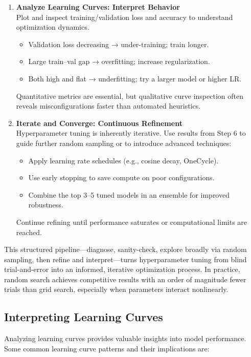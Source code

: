 \begin{enumerate}
	\item \textbf{Analyze Learning Curves: Interpret Behavior}\\
	Plot and inspect training/validation loss and accuracy to understand optimization dynamics.
	\begin{itemize}
		\item Validation loss decreasing → under-training; train longer.
		\item Large train–val gap → overfitting; increase regularization.
		\item Both high and flat → underfitting; try a larger model or higher LR.
	\end{itemize}
	Quantitative metrics are essential, but qualitative curve inspection often reveals misconfigurations faster than automated heuristics.
	
	\item \textbf{Iterate and Converge: Continuous Refinement}\\
	Hyperparameter tuning is inherently iterative.  
	Use results from Step 6 to guide further random sampling or to introduce advanced techniques:
	\begin{itemize}
		\item Apply learning rate schedules (e.g., cosine decay, OneCycle).
		\item Use early stopping to save compute on poor configurations.
		\item Combine the top 3–5 tuned models in an ensemble for improved robustness.
	\end{itemize}
	Continue refining until performance saturates or computational limits are reached.
\end{enumerate}

\noindent This structured pipeline—diagnose, sanity-check, explore broadly via random sampling, then refine and interpret—turns hyperparameter tuning from blind trial-and-error into an informed, iterative optimization process.  
In practice, random search achieves competitive results with an order of magnitude fewer trials than grid search, especially when parameters interact nonlinearly.

\subsection{Interpreting Learning Curves}
\label{subsec:learning_curves}

Analyzing learning curves provides valuable insights into model performance. Some common learning curve patterns and their implications are:

